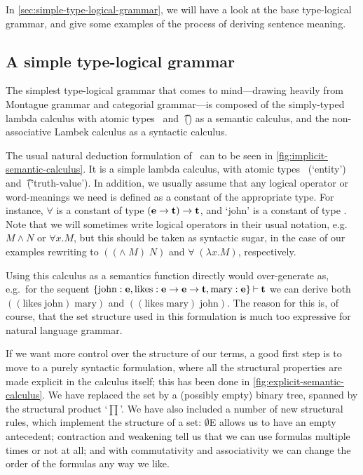 In \autoref{sec:simple-type-logical-grammar}, we will have a look at
the base type-logical grammar, and give some examples of the process
of deriving sentence meaning.



\subsection{A simple type-logical grammar}
\label{sec:simple-type-logical-grammar}

The simplest type-logical grammar that comes to mind---drawing
heavily from Montague grammar and categorial grammar---is composed of
the simply-typed lambda calculus with atomic types \e\ and \t\ (\lamET) as
a semantic calculus, and the non-associative Lambek calculus
\citep[NL;][]{lambek1961} as a syntactic calculus.

The usual natural deduction formulation of \lamET\ can to be seen in
\autoref{fig:implicit-semantic-calculus}. It is a simple lambda
calculus, with atomic types \e\ (`entity') and \t\ (`truth-value').
In addition, we usually assume that any logical operator or
word-meanings we need is defined as a constant of the appropriate
type. For instance, $\forall$ is a constant of type $(\mathbf{e}\rightarrow\mathbf{t})\rightarrow\mathbf{t}$,
and `john' is a constant of type \e. Note that we will sometimes write
logical operators in their usual notation, e.g.\ $M\wedge N$ or
$\forall x.M$, but this should be taken as syntactic sugar, in the
case of our examples rewriting to $(({\wedge}\;M)\;N)$ and
$\forall\;(\lambda{x}.M)$, respectively.

%

Using this calculus as a semantics function directly would
over-generate as, e.g.\ for the sequent $\{\text{john}:\mathbf{e},
\text{likes}:\mathbf{e}\rightarrow\mathbf{e}\rightarrow\mathbf{t}, \text{mary}:\mathbf{e}\}\mathbin{\vdash}\mathbf{t}$ we can derive
both $((\text{likes}\;\text{john})\;\text{mary})$ and
$((\text{likes}\;\text{mary})\;\text{john})$.
The reason for this is, of course, that the set structure used in this
formulation is much too expressive for natural language grammar.

If we want more control over the structure of our terms, a good first
step is to move to a purely syntactic formulation, where all the
structural properties are made explicit in the calculus itself; this
has been done in \autoref{fig:explicit-semantic-calculus}. We have
replaced the set by a (possibly empty) binary tree, spanned by the
structural product `$\prod$'. We have also included a number of new
structural rules, which implement the structure of a set: $\emptyset$E
allows us to have an empty antecedent; contraction and weakening tell
us that we can use formulas multiple times or not at all; and with
commutativity and associativity we can change the order of the
formulas any way we like.

